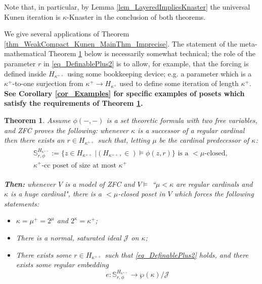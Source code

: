 \documentclass{amsart}
\newtheorem{theorem}{Theorem}
\begin{document}
Note that, in particular, by Lemma \ref{lem_LayeredImpliesKnaster} the universal Kunen iteration is $\kappa$-Knaster in the conclusion of both theorems.

We give several applications of Theorem \ref{thm_WeakCompact_Kunen_MainThm_Imprecise}.  The statement of the meta-mathematical Theorem \ref{thm_IdealAbsorb} below is necessarily somewhat technical; the role of the parameter $r$ in \eqref{eq_DefinablePlus2} is to allow, for example, that the forcing is defined inside $H_{\kappa^{++}}$ using some bookkeeping device; e.g. a parameter which is a $\kappa^+$-to-one surjection from $\kappa^+ \to H_{\kappa^+}$ used to define some iteration of length $\kappa^+$.  \textbf{See Corollary \ref{cor_Examples} for specific examples of posets which satisfy the requirements of Theorem \ref{thm_IdealAbsorb}.}
\begin{theorem}\label{thm_IdealAbsorb}
Assume $\phi(-,-)$ is a set theoretic formula with two free variables, and ZFC proves the following:  whenever $\kappa$ is a successor of a regular cardinal then there exists an $r \in H_{\kappa^{++}}$ such that, letting $\mu$ be the cardinal predecessor of $\kappa$:
\begin{align}\label{eq_DefinablePlus2}
\begin{split}
 \mathbb{S}^{H_{\kappa^{++}}}_{r,\phi}:= \big\{ z \in H_{\kappa^{++}} \ |   (H_{\kappa^{++}}, \in) \models \phi(z,r) \big\}  
\text{ is a } <\mu \text{-closed, } \\ 
 \kappa^+ \text{-cc poset} \text{ of size at most } \kappa^+
\end{split}
\end{align}


\noindent \textbf{Then:}  whenever $V$ is a model of ZFC and $V \models $ ``$\mu < \kappa$ are regular cardinals and $\kappa$ is a huge cardinal", there is a $<\mu$-closed poset in $V$ which forces the following statements:
\begin{itemize}
 \item $\kappa = \mu^+ = 2^\mu$ and $2^\kappa = \kappa^+$;
 \item There is a normal, saturated ideal $\mathcal{J}$ on $\kappa$;
 \item There exists some $r \in H_{\kappa^{++}}$ such that \eqref{eq_DefinablePlus2} holds, and there exists some regular embedding
\[
e: \mathbb{S}^{H_{\kappa^{++}}}_{r,\phi} \to \wp(\kappa)/\mathcal{J}
\]
\end{itemize}
\end{theorem}
\end{document}
